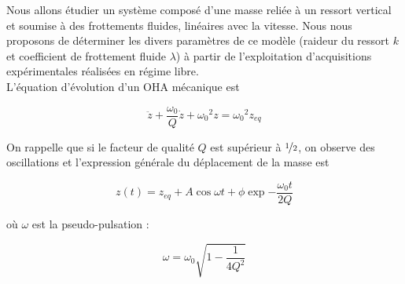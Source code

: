 \documentclass[a4paper,french,bookmarks]{article}
\begin{document}
\begin{minipage}{0.7\linewidth}
    Nous allons étudier un système composé d’une masse reliée à un ressort vertical et soumise à des frottements fluides, linéaires avec la vitesse. Nous nous proposons de déterminer les divers paramètres de ce modèle (raideur du ressort $k$ et coefficient de frottement fluide $\lambda$) à partir de l’exploitation d’acquisitions expérimentales réalisées en régime libre.\\

    L’équation d’évolution d’un OHA mécanique est

    \begin{equation}
        \boxed{
            \ddot z + \dfrac{\omega_0}{Q}\dot z + {\omega_0}^2z = {\omega_0}^2z_{eq}
        }
    \end{equation}

    On rappelle que si le facteur de qualité $Q$ est supérieur à $\nicefrac{1}{2}$, on observe des oscillations et l’expression générale du déplacement de la masse est

    \begin{equation}
        \boxed{
            z(t) = z_{eq} + A\cos{\omega t + \phi} \exp{-\dfrac{\omega_0 t}{2Q}}
        }
    \end{equation}

    où $\omega$ est la pseudo-pulsation :

    \begin{equation}
        \boxed{
            \omega = \omega_0 \sqrt{1-\dfrac{1}{4Q^2}}
        }
    \end{equation}

\end{minipage}
\end{document}
